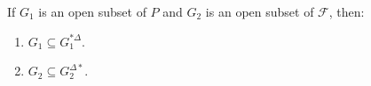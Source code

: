 If $G_1$ is an open subset of $P$ and $G_2$ is an open subset of $\mathcal{F}$, then:
\begin{enumerate}
\item $G_1 \subseteq G_1^{*\Delta}$.
\item $G_2 \subseteq G_2^{\Delta *}$.
\end{enumerate}
